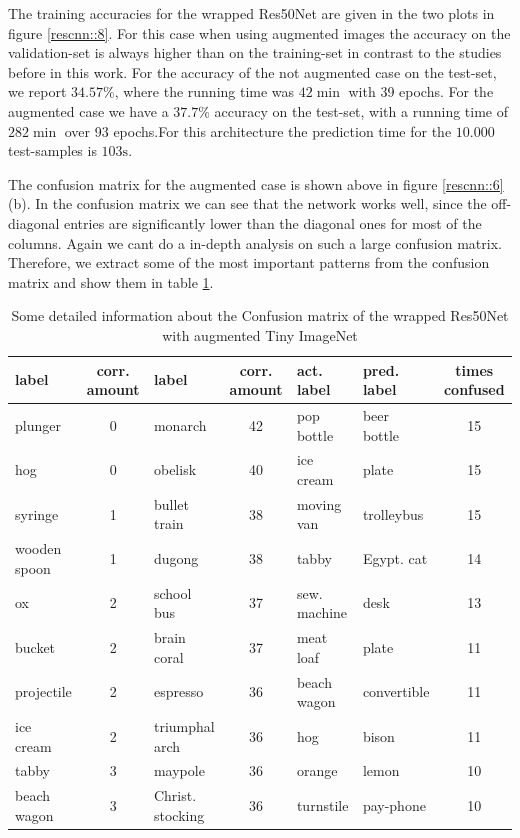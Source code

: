 \documentclass[11pt]{article}
\begin{document}
The training accuracies for the wrapped Res50Net are given in the two plots in figure \ref{rescnn::8}. For this case when using augmented images the accuracy on the validation-set is always higher than on the training-set in contrast to the studies before in this work. For the accuracy of the not augmented case on the test-set, we report $34.57\%$, where the running time was $42 \min$ with 39 epochs. For the augmented case we have a $37.7\%$ accuracy on the test-set, with a running time of $282\min$ over 93 epochs.For this architecture the prediction time for the $10.000$ test-samples is $103\text{s}$.

The confusion matrix for the augmented case is shown above in figure \ref{rescnn::6} (b). In the confusion matrix we can see that the network works well, since the off-diagonal entries are significantly lower than the diagonal ones for most of the columns. Again we cant do a in-depth analysis on such a large confusion matrix. Therefore, we extract some of the most important patterns from the confusion matrix and show them in table \ref{rescnn::9}.


\begin{table}[h]
\begin{tabular}{lc|lc|llc}
\toprule
       label &  corr. amount &              label &  corr. amount &   act. label & pred. label &  times confused \\
\midrule
     plunger &               0 &            monarch &              42 &     pop bottle &     beer bottle &              15 \\
         hog &               0 &            obelisk &              40 &      ice cream &           plate &              15 \\
     syringe &               1 &       bullet train &              38 &     moving van &      trolleybus &              15 \\
wooden spoon &               1 &             dugong &              38 &          tabby &    Egypt. cat &              14 \\
          ox &               2 &         school bus &              37 & sew. machine &            desk &              13 \\
      bucket &               2 &        brain coral &              37 &      meat loaf &           plate &              11 \\
  projectile &               2 &           espresso &              36 &    beach wagon &     convertible &              11 \\
   ice cream &               2 &     triumphal arch &              36 &            hog &           bison &              11 \\
       tabby &               3 &            maypole &              36 &         orange &           lemon &              10 \\
 beach wagon &               3 & Christ. stocking &              36 &      turnstile &       pay-phone &              10 \\
\bottomrule
\end{tabular}
\caption{Some detailed information about the Confusion matrix of the wrapped Res50Net with augmented Tiny ImageNet }
\label{rescnn::9}
\end{table}
\end{document}
